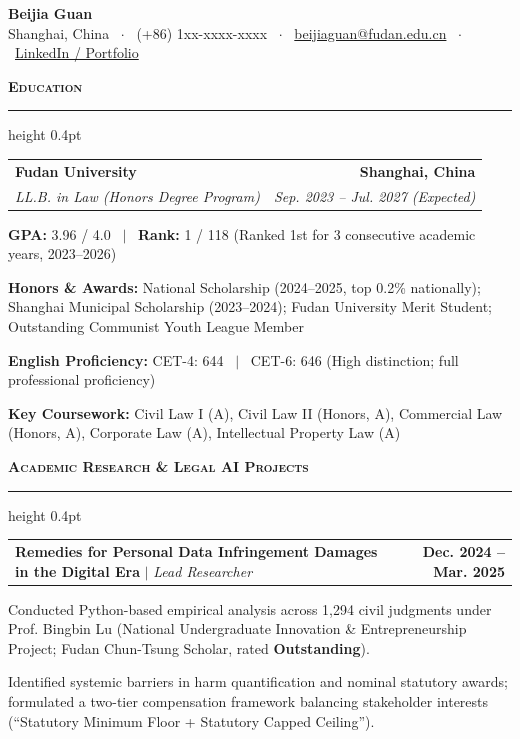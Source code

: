 \documentclass[9.5pt,a4paper]{article}
\makeatletter
\newcommand{\resumesection}[1]{%
  \vspace{3pt}%
  {\normalsize\textbf{\textsc{#1}}}%
  \vspace{1pt}%
  \hrule height 0.4pt%
  \vspace{2pt}%
}
\newenvironment{resumelist}{%
  \begin{list}{\raisebox{0.2ex}{\tiny$\bullet$}}{%
    \setlength{\leftmargin}{11pt}%
    \setlength{\rightmargin}{0pt}%
    \setlength{\labelwidth}{7pt}%
    \setlength{\labelsep}{4pt}%
    \setlength{\itemsep}{0.8pt}%
    \setlength{\parsep}{0pt}%
    \setlength{\topsep}{0.8pt}%
    \setlength{\partopsep}{0pt}%
  }%
}{%
  \end{list}%
  \vspace{0pt}%
}
\newcommand{\resumeSubheading}[4]{%
  \noindent\begin{tabularx}{\textwidth}{@{}X r@{}}%
    \textbf{#1} & \textbf{\footnotesize #2} \\%
    \textit{\footnotesize #3} & \textit{\footnotesize #4} \\%
  \end{tabularx}%
  \vspace{-3pt}%
}
\newcommand{\resumeProjectHeading}[2]{%
  \noindent\begin{tabularx}{\textwidth}{@{}X r@{}}%
    #1 & \textbf{\footnotesize #2} \\%
  \end{tabularx}%
  \vspace{-3pt}%
}
\makeatother
\begin{document}
\begin{center}
  {\LARGE \textbf{Beijia Guan}} \\[2pt]
  \footnotesize Shanghai, China \ $\cdot$ \ (+86) 1xx-xxxx-xxxx \ $\cdot$ \ \href{mailto:beijiaguan@fudan.edu.cn}{beijiaguan@fudan.edu.cn} \ $\cdot$ \ \href{https://linkedin.com/in/}{LinkedIn / Portfolio}
\end{center}
\vspace{-8pt}

\resumesection{Education}
\resumeSubheading{Fudan University}{Shanghai, China}{LL.B. in Law (Honors Degree Program)}{Sep. 2023 -- Jul. 2027 (Expected)}
\begin{resumelist}
  \item \textbf{GPA:} 3.96 / 4.0 \ $\vert$ \ \textbf{Rank:} 1 / 118 (Ranked 1st for 3 consecutive academic years, 2023--2026)
  \item \textbf{Honors \& Awards:} National Scholarship (2024--2025, top 0.2\% nationally); Shanghai Municipal Scholarship (2023--2024); Fudan University Merit Student; Outstanding Communist Youth League Member
  \item \textbf{English Proficiency:} CET-4: 644 \ $\vert$ \ CET-6: 646 (High distinction; full professional proficiency)
  \item \textbf{Key Coursework:} Civil Law I (A), Civil Law II (Honors, A), Commercial Law (Honors, A), Corporate Law (A), Intellectual Property Law (A)
\end{resumelist}

\resumesection{Academic Research \& Legal AI Projects}

\resumeProjectHeading{\textbf{Remedies for Personal Data Infringement Damages in the Digital Era} $\vert$ \textit{Lead Researcher}}{Dec. 2024 -- Mar. 2025}
\begin{resumelist}
  \item Conducted Python-based empirical analysis across 1,294 civil judgments under Prof. Bingbin Lu (National Undergraduate Innovation \& Entrepreneurship Project; Fudan Chun-Tsung Scholar, rated \textbf{Outstanding}).
  \item Identified systemic barriers in harm quantification and nominal statutory awards; formulated a two-tier compensation framework balancing stakeholder interests (``Statutory Minimum Floor + Statutory Capped Ceiling'').
\end{resumelist}
\end{document}
